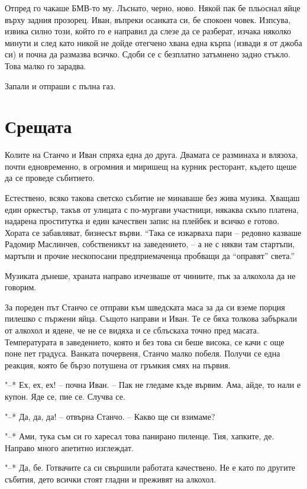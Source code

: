\documentclass[ebook,openany,12pt]{memoir}
\begin{document}
Отпред го чакаше БМВ-то му. Лъснато, черно, ново. Някой пак бе пльоснал яйце върху задния прозорец. Иван, въпреки осанката си, бе спокоен човек. Изпсува, извика силно този, който го е направил да слезе да се разберат, изчака няколко минути и след като никой не дойде отегчено хвана една кърпа (извади я от джоба си) и почна да размазва всичко. Сдоби се с безплатно затъмнено задно стъкло. Това малко го зарадва.

Запали и отпраши с пълна газ.

\chapter{Срещата}

Колите на Станчо и Иван спряха една до друга. Двамата се разминаха и влязоха, почти едновременно, в огромния и миришещ на курник ресторант, където щеше да се проведе събитието. 

Естествено, всяко такова светско събитие не минаваше без жива музика. Хващаш един оркестър, такъв от улицата с по-мургави участници, някаква скъпо платена, надарена проститутка и един качествен запис на плейбек и всичко е готово. Хората се забавляват, бизнесът върви. ``Така се изкарваха пари -- редовно казваше Радомир Маслинчев, собственикът на заведението, -- а не с някви там стартъпи, мартъпи и прочие нескопосани предприемаченца пробващи да ``оправят'' света.''

Музиката дънеше, храната направо изчезваше от чиниите, пък за алкохола да не говорим. 

За пореден път Станчо се отправи към шведската маса за да си вземе порция пилешко с пържени яйца. Същото направи и Иван. Те се бяха толкова забъркали от алкохол и ядене, че не се видяха и се сблъскаха точно пред масата. Температурата в заведението, която и без това си беше висока, се качи с още поне пет градуса. Ванката почервеня, Станчо малко побеля. Получи се една реакция, която бе бързо потушена от гръмкия смях на първия. 

"--* Ех, ех, ех! – почна Иван. – Пак не гледаме къде вървим. Ама, айде, то нали е купон. Яде се, пие се. Случва се.

"--* Да, да, да! – отвърна Станчо. – Какво ще си взимаме?

"--* Ами, тука съм си го харесал това панирано пиленце. Тия, хапките, де. Направо много апетитно изглеждат.

"--* Да, бе. Готвачите са си свършили работата качествено. Не е като по другите събития, дето всички стоят гладни и преживят на алкохол.
\end{document}
